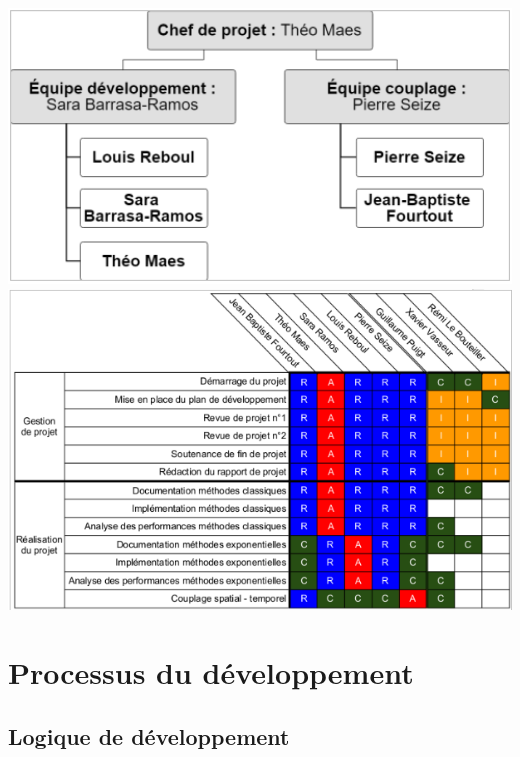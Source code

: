 \documentclass[a4paper,12pt]{report}
\theoremstyle{break}
\begin{document}
    \begin{center}
		
    \includegraphics[width=1\textwidth]{images/OBS.png}\\[1cm]
    
    \includegraphics[width=1\textwidth]{images/OB2.png}\\[1cm]

    \end{center} 
    
\chapter{Processus du développement}
\section{Logique de développement}
\end{document}
